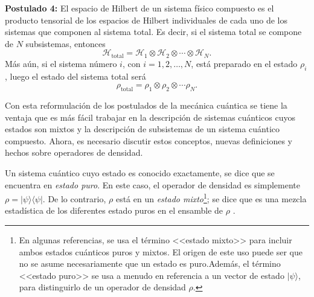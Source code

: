 \textbf{Postulado 4:} El espacio de Hilbert de un sistema físico compuesto es el producto tensorial de los espacios de Hilbert individuales de cada uno de los sistemas que componen al sistema total. Es decir, si el sistema total se compone de $N$ subsistemas, entonces \begin{equation}\label{Htotal4postulado}
	\mathcal{H}_{\text{total}}=\mathcal{H}_1\otimes \mathcal{H}_2\otimes \cdots \otimes \mathcal{H}_N.
\end{equation}
  Más aún, si el sistema número $i$, con $i=1,2,\ldots,N$, está preparado en el estado $\rho_i$, luego el estado del sistema total será  \begin{equation}\label{rhototal4postulado}
	\rho_{\text{total}}=\rho_1\otimes \rho_2 \otimes \cdots \rho_N.
\end{equation}


\setlength{\leftskip}{0pt}

Con esta reformulación de los postulados de la mecánica cuántica se tiene la
ventaja que es más fácil trabajar en la descripción de sistemas cuánticos cuyos estados son mixtos y la descripción de subsistemas de un sistema cuántico compuesto. Ahora, es necesario discutir estos conceptos, nuevas definiciones y hechos sobre operadores de densidad. 

Un sistema cuántico cuyo estado es conocido exactamente, se dice que
se encuentra en \textit{estado puro}. En este caso, el operador de densidad es
simplemente $\rho=|\psi \rangle \langle \psi|$. De lo contrario, $\rho$ está en
un \textit{estado mixto}\footnote{En algunas referencias, se  usa el término
<<estado mixto>> para incluir ambos estados cuánticos puros y mixtos. El origen
de este uso puede ser que no se asume necesariamente que un estado es puro.Además, el término <<estado puro>> se usa a menudo en referencia a un vector de
estado $|\psi\rangle $, para distinguirlo de un operador de densidad	$\rho$.
}; se dice que es una mezcla estadística de los diferentes estado puros en el ensamble de
$\rho$ {\cite{nielsen_chuang_2010}}. 

